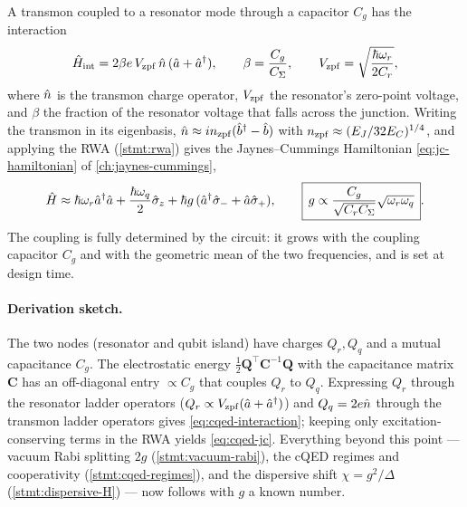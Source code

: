 \begin{statement}
\label{stmt:cqed-coupling}
A transmon coupled to a resonator mode through a capacitor $C_g$ has
the interaction
\begin{equation}
\label{eq:cqed-interaction}
\hat{H}_{\rm int} = 2\beta e\,V_{\rm zpf}\,\hat{n}\,(\hat a+\hat a^\dagger),
\qquad
\beta=\frac{C_g}{C_\Sigma},
\qquad
V_{\rm zpf}=\sqrt{\frac{\hbar\omega_r}{2C_r}},
\end{equation}
where $\hat{n}$ is the transmon charge operator, $V_{\rm zpf}$ the
resonator's zero-point voltage, and $\beta$ the fraction of the
resonator voltage that falls across the junction. Writing the transmon
in its eigenbasis, $\hat{n}\approx in_{\rm zpf}(\hat b^\dagger-\hat b)$
with $n_{\rm zpf}\approx(E_J/32E_C)^{1/4}$, and applying the RWA
(\cref{stmt:rwa}) gives the Jaynes--Cummings Hamiltonian
\cref{eq:jc-hamiltonian} of \cref{ch:jaynes-cummings},
\begin{equation}
\label{eq:cqed-jc}
\hat{H} \approx \hbar\omega_r\hat a^\dagger\hat a
+ \frac{\hbar\omega_q}{2}\hat\sigma_z
+ \hbar g\,(\hat a^\dagger\hat\sigma_- + \hat a\hat\sigma_+),
\qquad
\boxed{\,g \propto \frac{C_g}{\sqrt{C_rC_\Sigma}}\sqrt{\omega_r\omega_q}\,}.
\end{equation}
The coupling is fully determined by the circuit: it grows with the
coupling capacitor $C_g$ and with the geometric mean of the two
frequencies, and is set at design time.
\end{statement}

\paragraph{Derivation sketch.}
The two nodes (resonator and qubit island) have charges $Q_r,Q_q$ and
a mutual capacitance $C_g$. The electrostatic energy
$\tfrac12\mathbf Q^\top \mathbf C^{-1}\mathbf Q$ with the capacitance
matrix $\mathbf C$ has an off-diagonal entry $\propto C_g$ that couples
$Q_r$ to $Q_q$. Expressing $Q_r$ through the resonator ladder operators
($Q_r\propto V_{\rm zpf}(\hat a+\hat a^\dagger)$) and $Q_q=2e\hat{n}$
through the transmon ladder operators gives
\cref{eq:cqed-interaction}; keeping only excitation-conserving terms in
the RWA yields \cref{eq:cqed-jc}. Everything beyond this point ---
vacuum Rabi splitting $2g$ (\cref{stmt:vacuum-rabi}), the cQED regimes
and cooperativity (\cref{stmt:cqed-regimes}), and the dispersive shift
$\chi=g^2/\Delta$ (\cref{stmt:dispersive-H}) --- now follows with $g$ a
known number.

